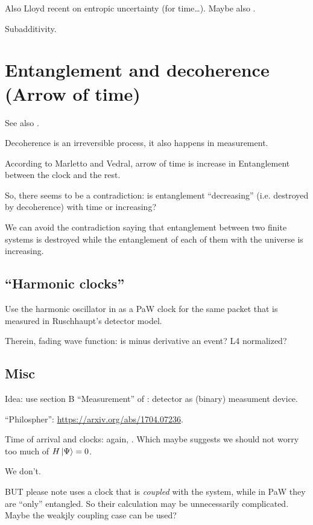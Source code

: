 Also Lloyd recent on entropic uncertainty (for time\dots \cite{Lloyd:Entropic}).
Maybe also \cite{Wehner:Uncertainty}.

Subadditivity.

\section{Entanglement and decoherence (Arrow of time)}
See also \cite{EntanglementVsDecoherence}.

Decoherence is an irreversible process, it also happens in measurement.

According to Marletto and Vedral, arrow of time is increase in Entanglement
between the clock and the rest.

So, there seems to be a contradiction: is entanglement ``decreasing''
(i.e. destroyed by decoherence) with time
or increasing?

We can avoid the contradiction saying that
entanglement between two finite systems is
destroyed while the entanglement of each of them with the universe
is increasing.

\subsection{``Harmonic clocks''}

Use the harmonic oscillator in \cite{HarmonicClocks}
as a PaW clock for the same packet that is measured in
Ruschhaupt's detector model.

Therein, fading wave function: is minus derivative an event?
L4 normalized?


\subsection{Misc}

Idea: use section B ``Measurement'' of \cite{Lloyd:Time}: detector as (binary) measument device.

``Philospher'': \url{https://arxiv.org/abs/1704.07236}.

Time of arrival and clocks: again, \cite{YearsleyHalliwell_Clocks}.
Which maybe suggests we should not worry too much of $H\ket{\Psi} = 0$.

We don't.

BUT please note \cite{YearsleyHalliwell_Clocks} uses a clock that is
\emph{coupled} with the system, while in PaW they are ``only'' entangled.
So their calculation may be unnecessarily complicated.
Maybe the weakjly coupling case can be used?

